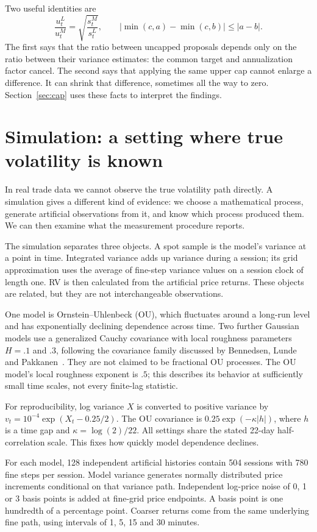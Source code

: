 Two useful identities are
\begin{equation}
 \frac{u_t^L}{u_t^M}=\sqrt{\frac{s_t^M}{s_t^L}},
 \qquad |\min(c,a)-\min(c,b)|\leq |a-b|.\label{eq:cap}
\end{equation}
The first says that the ratio between uncapped proposals depends only on the ratio between their variance estimates: the common target and annualization factor cancel. The second says that applying the same upper cap cannot enlarge a difference. It can shrink that difference, sometimes all the way to zero. Section~\ref{sec:cap} uses these facts to interpret the findings.

\section{Simulation: a setting where true volatility is known}\label{sec:simulation}
In real trade data we cannot observe the true volatility path directly. A simulation gives a different kind of evidence: we choose a mathematical process, generate artificial observations from it, and know which process produced them. We can then examine what the measurement procedure reports.

The simulation separates three objects. A spot sample is the model's variance at a point in time. Integrated variance adds up variance during a session; its grid approximation uses the average of fine-step variance values on a session clock of length one. RV is then calculated from the artificial price returns. These objects are related, but they are not interchangeable observations.

One model is Ornstein--Uhlenbeck (OU), which fluctuates around a long-run level and has exponentially declining dependence across time. Two further Gaussian models use a generalized Cauchy covariance with local roughness parameters $H=.1$ and $.3$, following the covariance family discussed by Bennedsen, Lunde and Pakkanen~\cite{blp}. They are not claimed to be fractional OU processes. The OU model's local roughness exponent is $.5$; this describes its behavior at sufficiently small time scales, not every finite-lag statistic.

For reproducibility, log variance $X$ is converted to positive variance by $v_t=10^{-4}\exp(X_t-0.25/2)$. The OU covariance is $0.25\exp(-\kappa|h|)$, where $h$ is a time gap and $\kappa=\log(2)/22$. All settings share the stated 22-day half-correlation scale. This fixes how quickly model dependence declines.

For each model, 128 independent artificial histories contain 504 sessions with 780 fine steps per session. Model variance generates normally distributed price increments conditional on that variance path. Independent log-price noise of 0, 1 or 3 basis points is added at fine-grid price endpoints. A basis point is one hundredth of a percentage point. Coarser returns come from the same underlying fine path, using intervals of 1, 5, 15 and 30 minutes.

